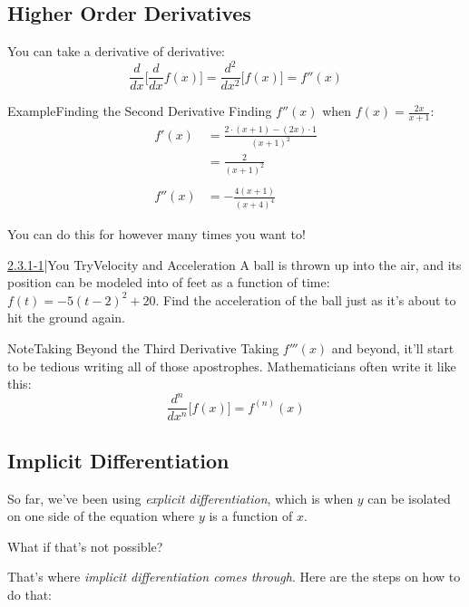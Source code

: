 \documentclass{MathNotes}
\newenvironment{example}[1]
{\begin{BlueBox}{Example}{#1}}{\end{BlueBox}}
\newenvironment{note}[1]
{\begin{YellowBox}{Note}{#1}}{\end{YellowBox}}
\newenvironment{practice}[2]
{\begin{PurpleBox}{\texorpdfstring{#1}\Big|You Try}{#2}}{\end{PurpleBox}}
\begin{document}
\newpage
\subsection{Higher Order Derivatives}
You can take a derivative of derivative:
\begin{displaymath}
    \frac{d}{dx}\big[\frac{d}{dx}f(x)\big]=\frac{d^2}{dx^2}\big[f(x)\big]
    =f''(x)
\end{displaymath}
\begin{example}{Finding the Second Derivative}
    Finding $f''(x)$ when $f(x)=\frac{2x}{x+1}$:
    \begin{align*}
        f'(x)&=\frac{2\cdot(x+1)-(2x)\cdot 1}{(x+1)^2}\\
        &=\frac{2}{(x+1)^2}\\
        \\
        f''(x)&=-\frac{4(x+1)}{(x+4)^4}
    \end{align*}
\end{example}
You can do this for however many times you want to!
\begin{practice}{\hyperref[ans:2.3.1-1]{2.3.1-1}}{Velocity and Acceleration}
    \label{prac:2.3.1-1}
    A ball is thrown up into the air, and its position can be modeled into
    of feet as a function of time: $f(t)=-5(t-2)^2+20$. Find the acceleration
    of the ball just as it's about to hit the ground again.
\end{practice}
\begin{note}{Taking Beyond the Third Derivative}
    Taking $f'''(x)$ and beyond, it'll start to be tedious writing all of those
    apostrophes. Mathematicians often write it like this:
    $$\frac{d^n}{dx^n}\big[f(x)\big]=f^{(n)}(x)$$
\end{note}

\subsection{Implicit Differentiation}
So far, we've been using \textit{explicit differentiation}, which is when $y$
can be isolated on one side of the equation where $y$ is a function of $x$.

What if that's not possible?

That's where \textit{implicit differentiation comes through}. Here are the 
steps on how to do that:
\end{document}
